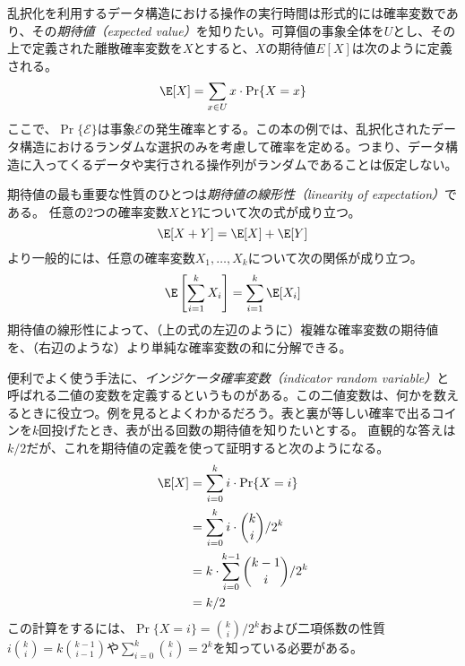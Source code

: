 乱択化を利用するデータ構造における操作の実行時間は形式的には確率変数であり、その\emph{期待値（expected value）}を知りたい。可算個の事象全体を$U$とし、その上で定義された離散確率変数を$X$とすると、$X$の期待値$E[X]$は次のように定義される。
%
\[
    \E[X] = \sum_{x\in U} x\cdot\Pr\{X=x\}
\]
ここで、$\Pr\{\mathcal{E}\}$は事象$\mathcal{E}$の発生確率とする。この本の例では、乱択化されたデータ構造におけるランダムな選択のみを考慮して確率を定める。つまり、データ構造に入ってくるデータや実行される操作列がランダムであることは仮定しない。

期待値の最も重要な性質のひとつは\emph{期待値の線形性（linearity of expectation）}である。
%
任意の2つの確率変数$X$と$Y$について次の式が成り立つ。
\[
   \E[X+Y] = \E[X] + \E[Y]
\]
より一般的には、任意の確率変数$ X_1,\ldots,X_k $について次の関係が成り立つ。
\[
   \E\left[\sum_{i=1}^k X_i\right] = \sum_{i=1}^k \E[X_i]
\]
期待値の線形性によって、（上の式の左辺のように）複雑な確率変数の期待値を、（右辺のような）より単純な確率変数の和に分解できる。

便利でよく使う手法に、\emph{インジケータ確率変数（indicator random variable）}と呼ばれる二値の変数を定義するというものがある。この二値変数は、何かを数えるときに役立つ。例を見るとよくわかるだろう。表と裏が等しい確率で出るコインを$k$回投げたとき、表が出る回数の期待値を知りたいとする。
直観的な答えは$k/2$だが、これを期待値の定義を使って証明すると次のようになる。
\begin{align*}
   \E[X] & = \sum_{i=0}^k i\cdot\Pr\{X=i\} \\
         & = \sum_{i=0}^k i\cdot\binom{k}{i}/2^k \\
         & = k\cdot \sum_{i=0}^{k-1}\binom{k-1}{i}/2^k \\
         & = k/2
\end{align*}
この計算をするには、$\Pr\{X=i\} = \binom{k}{i}/2^k$および二項係数の性質$i\binom{k}{i}=k\binom{k-1}{i-1}$や$\sum_{i=0}^{k} \binom{k}{i} = 2^{k}$を知っている必要がある。

